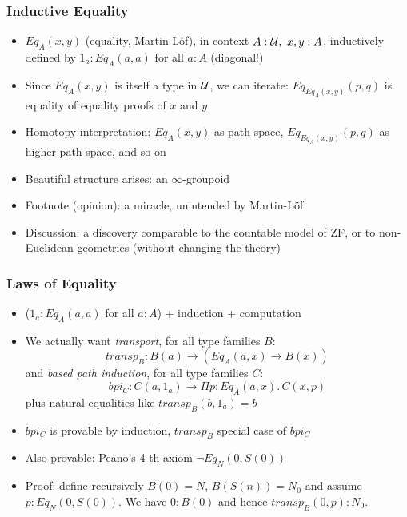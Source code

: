\documentclass[handout]{beamer}
\newcommand{\depi}[3]{\Pi{#1{:}#2.\,#3}}
\newcommand{\sigm}[3]{\Sigma{#1{:}#2.\,#3}}
\newcommand{\UU}{{\cal U}}
\begin{document}
 \frame
  {
  
    \frametitle{Inductive Equality}

    \begin{itemize}[<+->]
    \item $Eq_A(x,y)$ (equality, Martin-L\"of), in context $A:\UU,~x,y:A$, 
    inductively defined by $1_a : Eq_A(a,a)$ for all $a:A$ (diagonal!)
    \item Since $Eq_A(x,y)$ is itself a type in $\UU$, we can iterate:
    $Eq_{Eq_A(x,y)}(p,q)$ is equality of equality proofs of $x$ and $y$
    \item Homotopy interpretation: $Eq_A(x,y)$ as path space, 
$Eq_{Eq_A(x,y)}(p,q)$ as higher path space, and so on
   \item Beautiful structure arises: an $\infty$-groupoid
   \item Footnote (opinion): a miracle, unintended by Martin-L\"of
   \item Discussion: a discovery comparable to the countable model of ZF, 
   or to non-Euclidean geometries (without changing the theory)
    \end{itemize}
  }

 \frame
  {
  
    \frametitle{Laws of Equality}

    \begin{itemize}[<+->]
    \item ($1_a : Eq_A(a,a)$ for all $a:A$) + induction + computation
    \item We actually want \emph{transport}, for all type families $B$:
    \[ transp_B : B(a) \to (Eq_A(a,x) \to B(x))  \]
    and \emph{based path induction}, for all type families $C$:
    \[ bpi_C : C(a,1_a) \to \depi{p}{Eq_A(a,x)}{ C(x,p)}  \]
    plus natural equalities like $transp_B(b,1_a) = b$
    \item $bpi_C$ is provable by induction, $transp_B$ special case of $bpi_C$
    \item Also provable: Peano's 4-th axiom $\neg Eq_N(0,S(0))$
    \item Proof: define recursively $B(0)=N$, $B(S(n))=N_0$ and assume
    $p:Eq_N(0,S(0))$. We have $0:B(0)$  and hence $transp_B(0,p) : N_0$.
    \end{itemize}
  }
\end{document}
